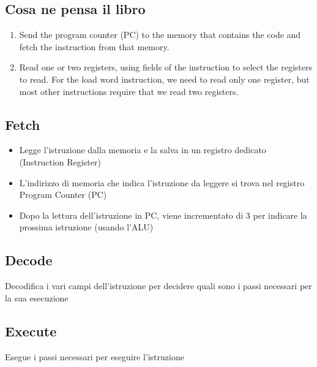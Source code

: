 \documentclass[12pt, a4paper, openany]{book}
\begin{document}
\subsection*{Cosa ne pensa il libro}
\begin{enumerate}
    \item Send the program counter (PC) to the memory that contains the code and
    fetch the instruction from that memory.
    \item Read one or two registers, using fields of the instruction to select the registers to read.
     For the load word instruction, we need to read only one register,
    but most other instructions require that we read two registers.    
\end{enumerate}
\subsection*{Fetch} \begin{itemize}
    \item Legge l'istruzione dalla memoria e la salva in un registro dedicato
    (Instruction Register)
    \item L'indirizzo di memoria che indica l'istruzione da leggere si trova nel registro
    Program Counter (PC)
    \item Dopo la lettura dell'istruzione in PC, viene incrementato di 3 per indicare la
    prossima istruzione (usando l'ALU)
\end{itemize}
\subsection*{Decode}
Decodifica i vari campi dell'istruzione per decidere quali sono i passi necessari
per la sua esecuzione

\subsection*{Execute}
Esegue i passi necessari per eseguire l'istruzione
\end{document}
